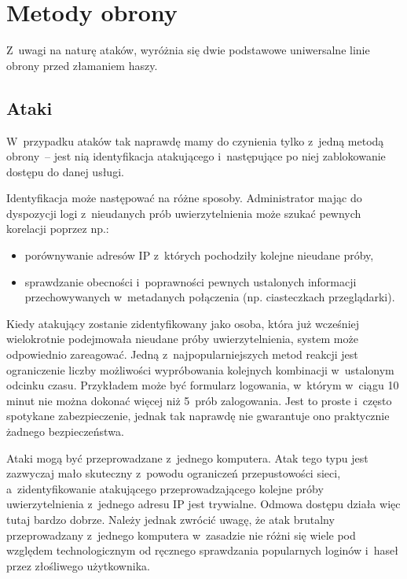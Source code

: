 \section{Metody obrony}

Z~uwagi na naturę ataków, wyróżnia się dwie podstawowe uniwersalne linie obrony
przed złamaniem haszy.

\subsection{Ataki }

W~przypadku ataków  tak naprawdę mamy do czynienia tylko z~jedną
metodą obrony~-- jest nią identyfikacja atakującego i~następujące po niej
zablokowanie dostępu do danej usługi.

Identyfikacja może następować na różne sposoby. Administrator mając do
dyspozycji logi z~nieudanych prób uwierzytelnienia może szukać pewnych
korelacji poprzez np.:

\begin{itemize}

\item porównywanie adresów IP z~których pochodziły kolejne nieudane próby,

\item sprawdzanie obecności i~poprawności pewnych ustalonych informacji
przechowywanych w~metadanych połączenia (np. ciasteczkach przeglądarki).

\end{itemize}

Kiedy atakujący zostanie zidentyfikowany jako osoba, która już wcześniej
wielokrotnie podejmowała nieudane próby uwierzytelnienia, system może
odpowiednio zareagować. Jedną z~najpopularniejszych metod reakcji jest
ograniczenie liczby możliwości wypróbowania kolejnych kombinacji w~ustalonym
odcinku czasu. Przykładem może być formularz logowania, w~którym w~ciągu 10
minut nie można dokonać więcej niż 5~prób zalogowania. Jest to proste i~często
spotykane zabezpieczenie, jednak tak naprawdę nie gwarantuje ono praktycznie
żadnego bezpieczeństwa.

Ataki  mogą być przeprowadzane z~jednego komputera. Atak tego typu
jest zazwyczaj mało skuteczny z~powodu ograniczeń przepustowości sieci,
a~zidentyfikowanie atakującego przeprowadzającego kolejne próby
uwierzytelnienia z~jednego adresu IP jest trywialne. Odmowa dostępu działa więc
tutaj bardzo dobrze. Należy jednak zwrócić uwagę, że atak brutalny
przeprowadzany z~jednego komputera w~zasadzie nie różni się wiele pod względem
technologicznym od ręcznego sprawdzania popularnych loginów i~haseł przez
złośliwego użytkownika.

